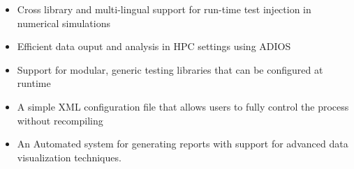 \begin{itemize}
 \item Cross library and multi-lingual support for run-time test injection in numerical simulations
 \item Efficient data ouput and analysis in HPC settings using ADIOS
 \item Support for modular, generic testing libraries that can be configured at runtime
 \item A simple XML configuration file that allows users to fully control the \VV process without recompiling
 \item An Automated system for generating \VV reports with support for advanced data visualization techniques.
\end{itemize}
